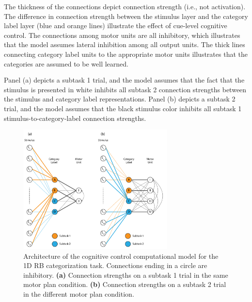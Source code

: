 \documentclass[doc, floatsintext]{apa7}
\begin{document}
The thickness of the connections depict connection strength
(i.e., not activation). The difference in connection
strength between the stimulus layer and the category label
layer (blue and orange lines) illustrate the effect of
cue-level cognitive control. The connections among motor
units are all inhibitory, which illustrates that the model
assumes lateral inhibition among all output units. The thick
lines connecting category label units to the appropriate
motor units illustrates that the categories are assumed to
be well learned.

Panel (a) depicts a subtask 1 trial, and the model assumes
that the fact that the stimulus is presented in white
inhibits all subtask 2 connection strengths between the
stimulus and category label representations. Panel (b)
depicts a subtask 2 trial, and the model assumes that the
black stimulus color inhibits all subtask 1
stimulus-to-category-label connection strengths.  

\begin{figure}[h!]
    \centering
    \includegraphics[width=0.7\textwidth]{../figures/fig_2.pdf}
    \caption{
        Architecture of the cognitive control computational
        model for the 1D RB categorization task. Connections
        ending in a circle are inhibitory. \textbf{(a)}
        Connection strengths on a subtask 1 trial in the same
        motor plan condition. \textbf{(b)} Connection strengths
        on a subtask 2 trial in the different motor plan
        condition.}
    \label{fig_2}
\end{figure}
\end{document}
